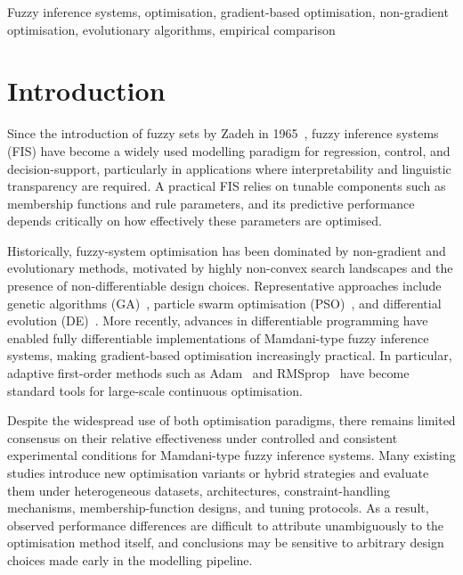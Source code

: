 \documentclass[conference]{IEEEtran}
\begin{document}
\begin{IEEEkeywords}
Fuzzy inference systems, optimisation, gradient-based optimisation,
non-gradient optimisation, evolutionary algorithms, empirical comparison
\end{IEEEkeywords}

\section{Introduction}

Since the introduction of fuzzy sets by Zadeh in 1965~\cite{zadeh1965},
fuzzy inference systems (FIS) have become a widely used modelling paradigm
for regression, control, and decision-support, particularly in applications
where interpretability and linguistic transparency are required.
A practical FIS relies on tunable components such as membership functions
and rule parameters, and its predictive performance depends critically on
how effectively these parameters are optimised.

Historically, fuzzy-system optimisation has been dominated by non-gradient
and evolutionary methods, motivated by highly non-convex search landscapes
and the presence of non-differentiable design choices.
Representative approaches include genetic algorithms (GA)~\cite{holland1975ga},
particle swarm optimisation (PSO)~\cite{kennedy1995pso}, and differential
evolution (DE)~\cite{storn1997de}.
More recently, advances in differentiable programming have enabled fully
differentiable implementations of Mamdani-type fuzzy inference systems,
making gradient-based optimisation increasingly practical.
In particular, adaptive first-order methods such as Adam~\cite{kingma2015adam}
and RMSprop~\cite{tieleman2012rmsprop} have become standard tools for
large-scale continuous optimisation.

Despite the widespread use of both optimisation paradigms, there remains
limited consensus on their relative effectiveness under controlled and
consistent experimental conditions for Mamdani-type fuzzy inference systems.
Many existing studies introduce new optimisation variants or hybrid strategies
and evaluate them under heterogeneous datasets, architectures,
constraint-handling mechanisms, membership-function designs, and tuning
protocols.
As a result, observed performance differences are difficult to attribute
unambiguously to the optimisation method itself, and conclusions may be
sensitive to arbitrary design choices made early in the modelling pipeline.
\end{document}
